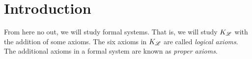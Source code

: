 \section{Introduction}
From here no out, we will study formal systems. That is, we will study \(K_{\mathscr{L}}\) with the addition of some axioms. The six axioms in \(K_{\mathscr{L}}\) are called \textit{logical axioms}. The additional axioms in a formal system are known as \textit{proper axioms}.

